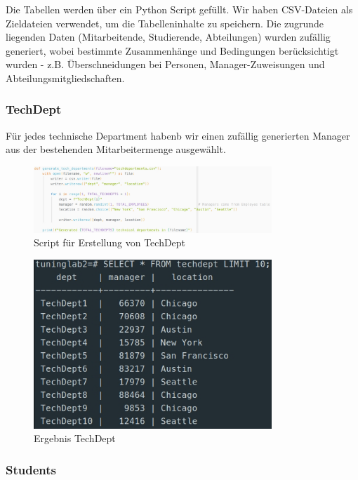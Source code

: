 \documentclass[11pt]{scrartcl}
\begin{document}
Die Tabellen werden über ein Python Script gefüllt. Wir haben CSV-Dateien als Zieldateien verwendet, um die Tabelleninhalte zu speichern. Die zugrunde liegenden Daten (Mitarbeitende, Studierende, Abteilungen) wurden zufällig generiert, wobei bestimmte Zusammenhänge und Bedingungen berücksichtigt wurden - z.B. Überschneidungen bei Personen, Manager-Zuweisungen und Abteilungsmitgliedschaften.

\subsubsection*{TechDept}
Für jedes technische Department habenb wir einen zufällig generierten Manager aus der bestehenden Mitarbeitermenge ausgewählt. 

\begin{figure}[htbp]
    \centering
    \includegraphics[width=0.8\textwidth]{Pics/TechDeptQuery.jpg}
    \caption{Script für Erstellung von TechDept}
    \label{fig:ScriptTechDept}
\end{figure}

\begin{figure}[htbp]
    \centering
    \includegraphics[width=0.8\textwidth]{Pics/TechDeptResult.jpg}
    \caption{Ergebnis TechDept}
    \label{fig:TechDeptResult}
\end{figure}

\subsubsection*{Students}
\end{document}
